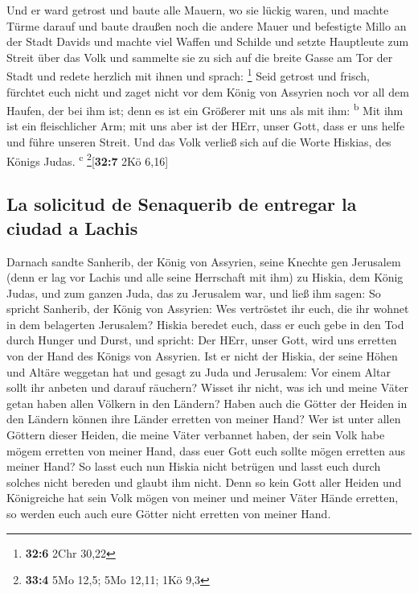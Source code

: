  Und er ward getrost und baute alle Mauern, wo sie lückig
waren, und machte Türme darauf und baute draußen noch die andere Mauer
und befestigte Millo an der Stadt Davids und machte viel Waffen und
Schilde  und setzte Hauptleute zum Streit über das Volk
und sammelte sie zu sich auf die breite Gasse am Tor der Stadt und
redete herzlich mit ihnen und sprach: \footnote{\textbf{32:6} 2Chr 30,22}
 Seid getrost und frisch, fürchtet euch nicht und zaget
nicht vor dem König von Assyrien noch vor all dem Haufen, der bei ihm
ist; denn es ist ein Größerer mit uns als mit ihm: \textsuperscript{b}
 Mit ihm ist ein fleischlicher Arm; mit uns aber ist der
HErr, unser Gott, dass er uns helfe und führe unseren Streit. Und das
Volk verließ sich auf die Worte Hiskias, des Königs Judas.
\textsuperscript{c} \footnote{\textbf{33:4} 5Mo 12,5; 5Mo 12,11; 1Kö 9,3}{[}\textbf{32:7}
2Kö 6,16{]}

\hypertarget{la-solicitud-de-senaquerib-de-entregar-la-ciudad-a-lachis}{%
\subsection{La solicitud de Senaquerib de entregar la ciudad a
Lachis}\label{la-solicitud-de-senaquerib-de-entregar-la-ciudad-a-lachis}}

 Darnach sandte Sanherib, der König von Assyrien, seine
Knechte gen Jerusalem (denn er lag vor Lachis und alle seine Herrschaft
mit ihm) zu Hiskia, dem König Judas, und zum ganzen Juda, das zu
Jerusalem war, und ließ ihm sagen:  So spricht Sanherib,
der König von Assyrien: Wes vertröstet ihr euch, die ihr wohnet in dem
belagerten Jerusalem?  Hiskia beredet euch, dass er euch
gebe in den Tod durch Hunger und Durst, und spricht: Der HErr, unser
Gott, wird uns erretten von der Hand des Königs von Assyrien.
 Ist er nicht der Hiskia, der seine Höhen und Altäre
weggetan hat und gesagt zu Juda und Jerusalem: Vor einem Altar sollt ihr
anbeten und darauf räuchern?  Wisset ihr nicht, was ich
und meine Väter getan haben allen Völkern in den Ländern? Haben auch die
Götter der Heiden in den Ländern können ihre Länder erretten von meiner
Hand?  Wer ist unter allen Göttern dieser Heiden, die
meine Väter verbannet haben, der sein Volk habe mögem erretten von
meiner Hand, dass euer Gott euch sollte mögen erretten aus meiner Hand?
 So lasst euch nun Hiskia nicht betrügen und lasst euch
durch solches nicht bereden und glaubt ihm nicht. Denn so kein Gott
aller Heiden und Königreiche hat sein Volk mögen von meiner und meiner
Väter Hände erretten, so werden euch auch eure Götter nicht erretten von
meiner Hand.

